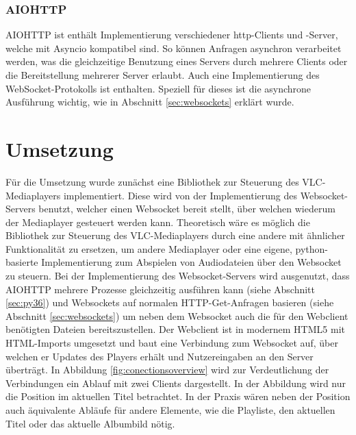 \documentclass[12pt,a4paper,hidelinks]{scrreprt}
\begin{document}
\subsection{AIOHTTP}
	AIOHTTP ist enthält Implementierung verschiedener \gls{http}-Clients und -Server, welche mit Asyncio kompatibel sind. So können Anfragen asynchron verarbeitet werden, was die gleichzeitige Benutzung eines Servers durch mehrere Clients oder die Bereitstellung mehrerer Server erlaubt. Auch eine Implementierung des WebSocket-Protokolls ist enthalten. Speziell für dieses ist die asynchrone Ausführung wichtig, wie in Abschnitt \ref{sec:websockets} erklärt wurde.


\chapter{Umsetzung}\label{ch:umsetzung}
	Für die Umsetzung wurde zunächst eine Bibliothek zur Steuerung des VLC-Mediaplayers implementiert. 
	Diese wird von der Implementierung des Websocket-Servers benutzt, welcher einen Websocket bereit stellt, über welchen wiederum der Mediaplayer gesteuert werden kann. Theoretisch wäre es möglich die Bibliothek zur Steuerung des VLC-Mediaplayers durch eine andere mit ähnlicher Funktionalität zu ersetzen, um andere Mediaplayer oder eine eigene, python-basierte Implementierung zum Abspielen von Audiodateien über den Websocket zu steuern.
	Bei der Implementierung des Websocket-Servers wird ausgenutzt, dass AIOHTTP mehrere Prozesse gleichzeitig ausführen kann (siehe Abschnitt \ref{sec:py36}) und Websockets auf normalen HTTP-Get-Anfragen basieren (siehe Abschnitt \ref{sec:websockets}) um neben dem Websocket auch die für den Webclient benötigten Dateien bereitszustellen.
	Der Webclient ist in modernem HTML5 mit HTML-Imports umgesetzt und baut eine Verbindung zum Websocket auf, über welchen er Updates des Players erhält und Nutzereingaben an den Server überträgt.
	In Abbildung \ref{fig:conectionsoverview} wird zur Verdeutlichung der Verbindungen ein Ablauf mit zwei Clients dargestellt. In der Abbildung wird nur die Position im aktuellen Titel betrachtet. In der Praxis wären neben der Position auch äquivalente Abläufe für andere Elemente, wie die Playliste, den aktuellen Titel oder das aktuelle Albumbild nötig.
	
\end{document}
